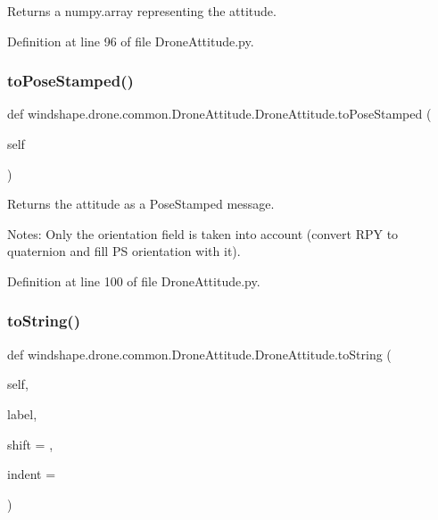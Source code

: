 \begin{DoxyVerb}
\begin{DoxyVerb}Returns a numpy.array representing the attitude.\end{DoxyVerb}
 

Definition at line 96 of file Drone\+Attitude.\+py.

\mbox{\label{classwindshape_1_1drone_1_1common_1_1_drone_attitude_1_1_drone_attitude_a4084bc01dc5a69a8458dab944441bd1d}} 
\subsubsection{\texorpdfstring{to\+Pose\+Stamped()}{toPoseStamped()}}
{\footnotesize\ttfamily def windshape.\+drone.\+common.\+Drone\+Attitude.\+Drone\+Attitude.\+to\+Pose\+Stamped (\begin{DoxyParamCaption}\item[{}]{self }\end{DoxyParamCaption})}

\begin{DoxyVerb}Returns the attitude as a PoseStamped message.

Notes:
    Only the orientation field is taken into account (convert 
    RPY to quaternion and fill PS orientation with it).
\end{DoxyVerb}
 

Definition at line 100 of file Drone\+Attitude.\+py.

\mbox{\label{classwindshape_1_1drone_1_1common_1_1_drone_attitude_1_1_drone_attitude_ab8a7d91f530c6cd77d9ba0f6a20084b9}} 
\subsubsection{\texorpdfstring{to\+String()}{toString()}}
{\footnotesize\ttfamily def windshape.\+drone.\+common.\+Drone\+Attitude.\+Drone\+Attitude.\+to\+String (\begin{DoxyParamCaption}\item[{}]{self,  }\item[{}]{label,  }\item[{}]{shift = {},  }\item[{}]{indent = {} }\end{DoxyParamCaption})}


\end{DoxyVerb}
